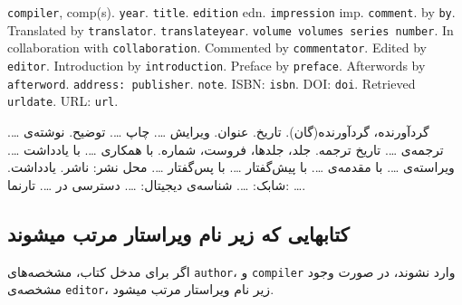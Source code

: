 \documentclass[a4paper,11pt]{article}
\begin{document}
\begin{itemize}[nosep]
\begin{latin}
\item[] []
{\tt compiler}, comp(s). {\tt year}. {\tt title}. {\tt edition} edn. {\tt impression} imp. {\tt comment}. by {\tt by}. Translated by {\tt translator}. {\tt translateyear}. {\tt volume volumes series number}. In collaboration with {\tt collaboration}. Commented by {\tt commentator}. Edited by {\tt editor}. Introduction by {\tt introduction}. Preface by {\tt preface}. Afterwords by {\tt afterword}. {\tt address: publisher}. {\tt note}. ISBN: {\tt isbn}. DOI: {\tt doi}. Retrieved {\tt urldate}. URL: {\tt url}. 
\end{latin}

\item[] []
{\persianttfamily گردآورنده}، گردآورنده‌‌‌‌(گان). {\persianttfamily تاریخ}. {\persianttfamily عنوان}. ویرایش {\persianttfamily …}. چاپ {\persianttfamily …}. {\persianttfamily توضیح}. نوشته‌ی {\persianttfamily …}. ترجمه‌ی {\persianttfamily …}. {\persianttfamily تاریخ ترجمه}. {\persianttfamily جلد، جلدها، فروست، شماره}. با همکاری {\persianttfamily …}. با یادداشت {\persianttfamily …}. ویراسته‌ی {\persianttfamily …}. با مقدمه‌ی {\persianttfamily …}. با پیش‌گفتار {\persianttfamily …}. با پس‌گفتار {\persianttfamily …}. {\persianttfamily محل نشر: ناشر}. {\persianttfamily یادداشت}. شابک: {\persianttfamily …}. شناسه‌ی دیجیتال: {\persianttfamily …}. دسترسی در {\persianttfamily …}. تارنما: {\persianttfamily …}.
\end{itemize}





\subsection{کتابهایی که زیر نام ویراستار مرتب میشوند}
اگر برای مدخل کتاب، مشخصه‌های \verb|author|، و \verb|compiler| وارد نشوند، در صورت وجود مشخصه‌ی \verb|editor|، زیر نام ویراستار مرتب میشود.
\end{document}

